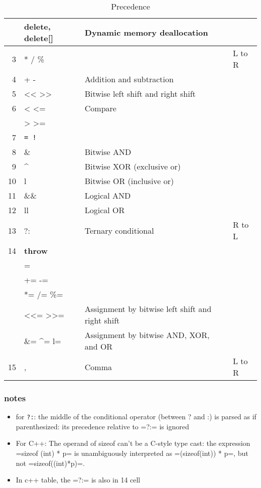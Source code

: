 \begin{table}[ht]
\begin{tabular}{r|l|l|l}
               & \textbf{\textbf{delete, delete[]}} & Dynamic memory deallocation & \\
    \hline
    3 & * / \% &  & L to R\\
    4 & + - & Addition and subtraction & \\
    5 & << >> & Bitwise left shift and right shift & \\
    6 & < <= & Compare & \\
               & > >= &  & \\
    7 & \texttt{= !} &  & \\
    8 & \& & Bitwise AND & \\
    9 & \^{} & Bitwise XOR (exclusive or) & \\
    10 & l & Bitwise OR (inclusive or) & \\
    11 & \&\& & Logical AND & \\
    12 & ll & Logical OR & \\
    13 & ?: & Ternary conditional & R to L\\
    \hline
    14 & \textbf{\textbf{throw}} &  & \\
               & = &  & \\
               & += -= &  & \\
               & *= /= \%= &  & \\
               & <<= >>= & Assignment by bitwise left shift and right shift & \\
               & \&= \^{}= l= & Assignment by bitwise AND, XOR, and OR & \\
    \hline
    15 & , & Comma & L to R\\
  \end{tabular}
  \caption{Precedence}
\end{table}

\subsubsection{notes}
\begin{itemize}
\item for \texttt{?:}: the middle of the conditional operator (between ? and :) is
  parsed as if parenthesized: its precedence relative to =?:= is
  ignored
\item For C++: The operand of sizeof can't be a C-style type cast:
 the expression =sizeof (int) * p= is unambiguously interpreted as =(sizeof(int)) * p=,
 but not =sizeof((int)*p)=.
\item In c++ table, the =?:= is also in 14 cell
\end{itemize}

